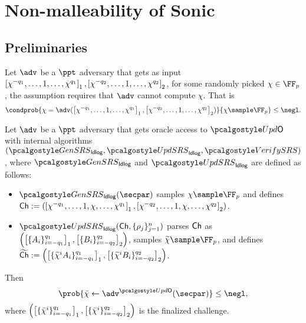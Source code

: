 
\section{Non-malleability of Sonic}
\label{sec:sonic}


\subsection{Preliminaries}
\begin{definition}\label{def:ldlog}
  Let $\adv$ be a $\ppt$ adversary that gets as input
  $\left[\chi^{-q_1}, \ldots, 1, \ldots, \chi^{q_1}\right]_{1}, \left[\chi^{-q_2},
    \ldots, 1, \ldots, \chi^{q_2}\right]_{2}$, for some randomly picked
  $\chi \in \FF_p$, the assumption requires that $\adv$ cannot compute $\chi$. That is
	\[
    \condprob{\chi = \adv(\gone{\chi^{-q_1}, \ldots, 1, \ldots,
        \chi^{q_1}}, \gtwo{\chi^{-q_2}, \ldots, 1, \ldots, \chi^{q_2}
      })}{\chi \sample \FF_p} \leq \negl.
	\]
\end{definition}

\begin{definition}\label{def:uldlog}
	Let $\adv$ be a $\ppt$ adversary that gets oracle access to $\initU$ with internal algorithms $(\kgen_{\ldlog}, \upd_{\ldlog}, \verifyCRS)$, where $\kgen_{\ldlog}$ and $\upd_{\ldlog}$ are defined as follows:
	\begin{itemize}
		\item $\kgen_\ldlog(\secpar)$ samples $\chi \sample \FF_p$ and defines 
		$\mathsf{Ch}:=(\left[\chi^{-q_1}, \ldots, 1, \chi, \ldots,
			\chi^{q_1}\right]_{1}, \left[\chi^{-q_2}, \ldots, 1, \chi, \ldots, \chi^{q_2}
		\right]_{2})$.
		\item $\upd_\ldlog(\Ch, \{\rho_j \}_{j=1}^n)$ 
		parses $\mathsf{Ch}$ as $\left( \left[\{A_i\}_{i = -q_1}^{q_1}\right]_{1},
		\left[\{B_i\}_{i = -q_2}^{q_2}\right]_{2} \right)$, samples
		$\widetilde{\chi} \sample \FF_p$, and defines
		$\widetilde{\mathsf{Ch}} := 
		\left( \left[\{\widetilde{\chi}^i A_i\}_{i = -q_1}^{q_1}\right]_{1},
		\left[\{\widetilde{\chi}^i B_i\}_{i = -q_2}^{q_2}\right]_{2} \right)$.
	\end{itemize}
	Then
	\[
	\prob{\bar{\chi} \gets \adv^{\initU}(\secpar)} \leq \negl,
	\]
	where $\left( \left[\{\bar{\chi}^i\}_{i = -q_1}^{q_1}\right]_{1},
	\left[\{\bar{\chi}^i\}_{i = -q_2}^{q_2}\right]_{2} \right)$ is the finalized challenge.
\end{definition}

